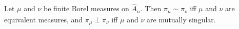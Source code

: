 Let $\mu$ and $\nu$ be finite Borel measures on $\hat{A}_n$. Then $\pi_\mu \sim \pi_\nu$ iff $\mu$ and $\nu$ are equivalent measures, and $\pi_\mu \perp \pi_\nu$ iff $\mu$ and $\nu$ are mutually singular.
